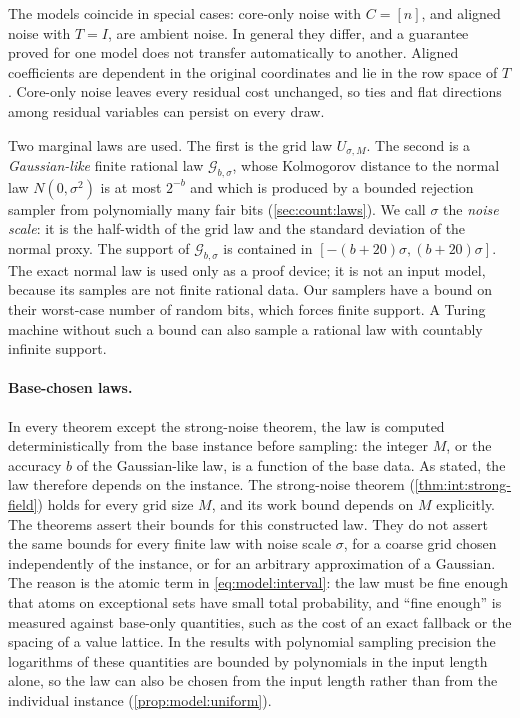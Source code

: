The models coincide in special cases: core-only noise with $C=[n]$, and
aligned noise with $T=I$, are ambient noise. In general they differ, and a
guarantee proved for one model does not transfer automatically to another.
Aligned coefficients are dependent in the original coordinates and lie in
the row space of $T$. Core-only noise leaves every residual cost unchanged,
so ties and flat directions among residual variables can persist on every
draw.

Two marginal laws are used. The first is the grid law $U_{\sigma,M}$. The
second is a \emph{Gaussian-like} finite rational law $\mathcal G_{b,\sigma}$,
whose Kolmogorov distance to the normal law $N(0,\sigma^2)$ is at most
$2^{-b}$ and which is produced by a bounded rejection sampler from
polynomially many fair bits (\cref{sec:count:laws}). We call $\sigma$ the
\emph{noise scale}: it is the half-width of the grid law and the standard
deviation of the normal proxy. The support of $\mathcal G_{b,\sigma}$ is
contained in $[-(b+20)\sigma,(b+20)\sigma]$. The
exact normal law is used only as a proof device; it is not an input model,
because its samples are not finite rational data.
Our samplers have a bound on their worst-case number of random bits, which
forces finite support. A Turing machine without such a bound can also sample
a rational law with countably infinite support.

\paragraph{Base-chosen laws.}
In every theorem except the strong-noise theorem, the law is computed
deterministically from the base instance before sampling: the integer $M$,
or the accuracy $b$ of the Gaussian-like law, is a function of the base data.
As stated, the law therefore depends on the instance. The strong-noise theorem
(\cref{thm:int:strong-field}) holds for every grid size $M$, and its work
bound depends on $M$ explicitly. The theorems assert their bounds for this
constructed law. They do not assert the same bounds for every finite law
with noise scale $\sigma$, for a coarse grid chosen independently of the
instance, or for an arbitrary approximation of a Gaussian. The reason is the
atomic term in \eqref{eq:model:interval}: the law must be fine enough that
atoms on exceptional sets have small total probability, and ``fine enough''
is measured against base-only quantities, such as the cost of an exact
fallback or the spacing of a value lattice. In the results with polynomial
sampling precision the logarithms of these quantities are bounded by
polynomials in the input length alone, so the law can also be chosen from
the input length rather than from the individual instance
(\cref{prop:model:uniform}).

